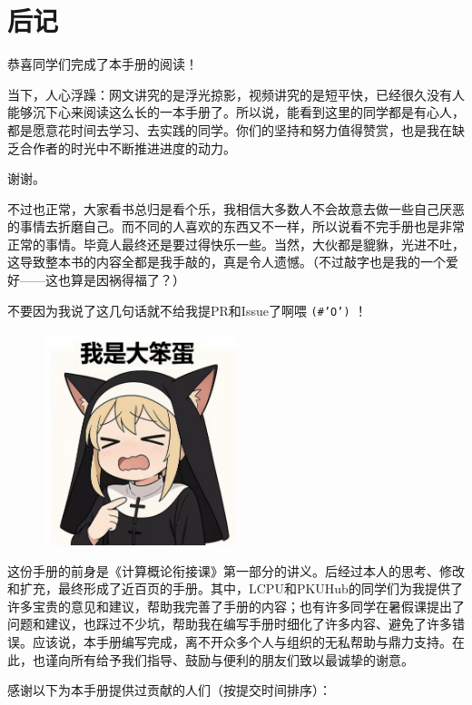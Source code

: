 \documentclass[../main.tex]{subfiles}
\begin{document}
\chapter{后记}

恭喜同学们完成了本手册的阅读！

当下，人心浮躁：网文讲究的是浮光掠影，视频讲究的是短平快，已经很久没有人能够沉下心来阅读这么长的一本手册了。所以说，能看到这里的同学都是有心人，都是愿意花时间去学习、去实践的同学。你们的坚持和努力值得赞赏，也是我在缺乏合作者的时光中不断推进进度的动力。

谢谢。

不过也正常，大家看书总归是看个乐，我相信大多数人不会故意去做一些自己厌恶的事情去折磨自己。而不同的人喜欢的东西又不一样，所以说看不完手册也是非常正常的事情。毕竟人最终还是要过得快乐一些。当然，大伙都是貔貅，光进不吐，这导致整本书的内容全都是我手敲的，真是令人遗憾。（不过敲字也是我的一个爱好——这也算是因祸得福了？）

不要因为我说了这几句话就不给我提PR和Issue了啊喂 \texttt{(\#'O')} ！

\begin{figure}[ht]
  \centering
  \includegraphics[width=0.5\textwidth]{images/idiot.png}
\end{figure}

这份手册的前身是《计算概论衔接课》第一部分的讲义。后经过本人的思考、修改和扩充，最终形成了近百页的手册。其中，LCPU和PKUHub的同学们为我提供了许多宝贵的意见和建议，帮助我完善了手册的内容；也有许多同学在暑假课提出了问题和建议，也踩过不少坑，帮助我在编写手册时细化了许多内容、避免了许多错误。应该说，本手册编写完成，离不开众多个人与组织的无私帮助与鼎力支持。在此，也谨向所有给予我们指导、鼓励与便利的朋友们致以最诚挚的谢意。

感谢以下为本手册提供过贡献的人们（按提交时间排序）：
\end{document}
